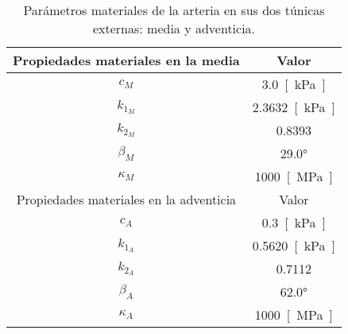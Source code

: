 \documentclass[fontsize=10pt,paper=letter,headings=big,bibliography=totoc,DIV=8]{scrbook}
\begin{document}
\begin{table}
\centering
{}
\begin{tabularx}{3.4in}{@{\kern\tabcolsep}CS[table-format=4.4]<{\kern\tabcolsep}}
\toprule
Propiedades materiales en la media & Valor \\
\midrule
$c_M$      & \SI{3.0}{[\kilo\pascal]} \\
$k_{1_M}$  & \SI{2.3632}{[\kilo\pascal]} \\
$k_{2_M}$  & \num{0.8393} \\
$\beta_M$  & \ang{29.0} \\
$\kappa_M$ & \SI{1000}{[\mega\pascal]}\\
\midrule
Propiedades materiales en la adventicia & Valor \\
\midrule
$c_A$      & \SI{0.3}{[\kilo\pascal]} \\
$k_{1_A}$  & \SI{0.5620}{[\kilo\pascal]} \\
$k_{2_A}$  & \num{0.7112} \\
$\beta_A$  & \ang{62.0} \\
$\kappa_A$ & \SI{1000}{[\mega\pascal]} \\
\bottomrule
\end{tabularx}
\caption[Parámetros materiales de la arteria]{Parámetros materiales de la arteria en sus dos túnicas externas: media y adventicia.}
\label{taula:param}
\end{table}
\end{document}
